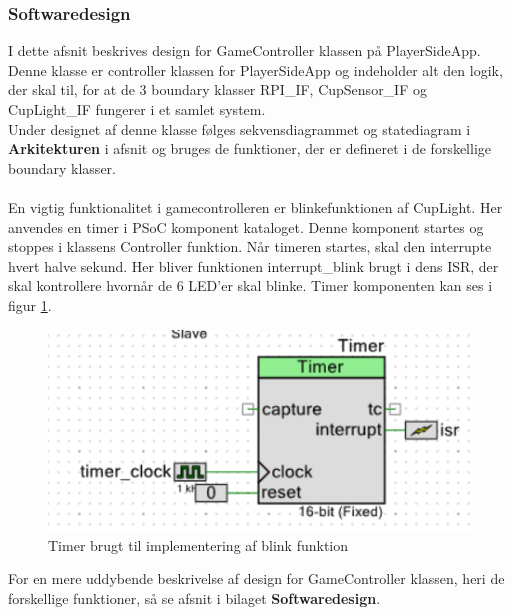 \documentclass[Rapport/Playerside/GameController/GameController.tex]{subfiles}
\begin{document}
\subsubsection{Softwaredesign}
I dette afsnit beskrives design for GameController klassen på PlayerSideApp. Denne klasse er controller klassen for PlayerSideApp og indeholder alt den logik, der skal til, for at de 3 boundary klasser RPI\_IF, CupSensor\_IF og CupLight\_IF fungerer i et samlet system.\\
Under designet af denne klasse følges sekvensdiagrammet og statediagram i \textbf{Arkitekturen} i afsnit  og bruges de funktioner, der er defineret i de forskellige boundary klasser.\\\\
En vigtig funktionalitet i gamecontrolleren er blinkefunktionen af CupLight. Her anvendes en timer i PSoC komponent kataloget. Denne komponent startes og stoppes i klassens Controller funktion. Når timeren startes, skal den interrupte hvert halve sekund. Her bliver funktionen interrupt\_blink brugt i dens ISR, der skal kontrollere hvornår de 6 LED'er skal blinke. Timer komponenten kan ses i figur \ref{fig:Timer}.
\begin{figure}[H]
    \centering 
    \includegraphics[width=0.5\linewidth]{Softwaredesign/GameController/graphic/gamecontroller_timer.PNG}
    \caption{Timer brugt til implementering af blink funktion}
    \label{fig:Timer}
\end{figure}
For en mere uddybende beskrivelse af design for GameController klassen, heri de forskellige funktioner, så se afsnit  i bilaget \textbf{Softwaredesign}.
\end{document}
